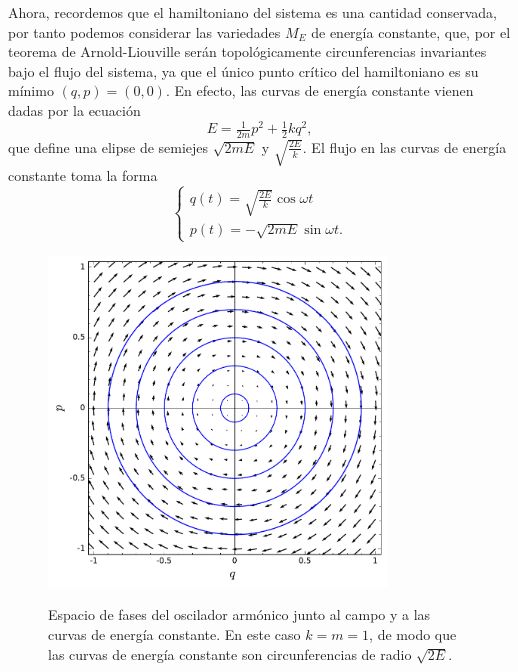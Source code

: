   Ahora, recordemos que el hamiltoniano del sistema es una cantidad conservada, por tanto podemos considerar las variedades $M_E$ de energía constante, que, por el teorema de Arnold-Liouville serán topológicamente circunferencias invariantes bajo el flujo del sistema, ya que el único punto crítico del hamiltoniano es su mínimo $(q,p)=(0,0)$. En efecto, las curvas de energía constante vienen dadas por la ecuación
  \begin{equation*}
    E=\tfrac{1}{2m}p^2+\tfrac{1}{2}kq^2,
  \end{equation*}
  que define una elipse de semiejes $\sqrt{2mE}$ y $\sqrt{\frac{2E}{k}}$. El flujo en las curvas de energía constante toma la forma
  \begin{equation*}
    \begin{cases}
      q(t)=\sqrt{\frac{2E}{k}}\cos\omega t \\ 
      p(t)=-\sqrt{2mE}\sin\omega t.
 \end{cases}
  \end{equation*}
  
  \begin{figure}[h]
    \centering
    \includegraphics[width=0.8\textwidth]{pics/oscilador}
    \label{fig:oscilador}
    \caption{\small Espacio de fases del oscilador armónico junto al campo y a las curvas de energía constante. En este caso $k=m=1$, de modo que las curvas de energía constante son circunferencias de radio $\sqrt{2E}$.}
  \end{figure}

